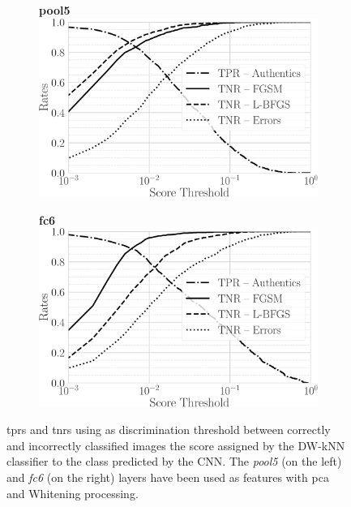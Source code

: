 \begin{figure}
\centering
%
\begin{subfigure}[t]{0.5\linewidth}
\centering
\textbf{pool5}\\
\includegraphics[width=\linewidth]{rates-pool5}%
\label{fig:adv:tpfn-dist-pool5}
\end{subfigure}%
%
\begin{subfigure}[t]{0.5\linewidth}
\centering
\textbf{fc6}\\
\includegraphics[width=\linewidth]{rates-fc6}%
\label{fig:adv:tpfn-dist-fc6}
\end{subfigure}%
\caption{\glspl{tpr} and \glspl{tnr} using as discrimination threshold between correctly and incorrectly classified images the score assigned by the DW-kNN classifier to the class predicted by the CNN.
The \emph{pool5} (on the left) and \emph{fc6} (on the right) layers have been used as features with \gls{pca} and Whitening processing.}
\label{fig:adv:tptn-distribs}
\end{figure}

